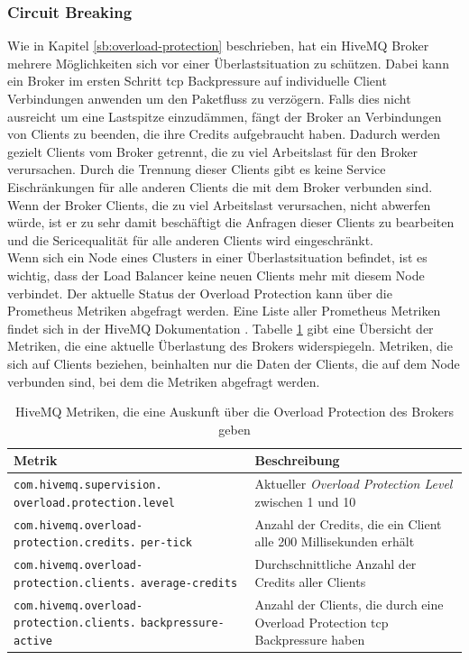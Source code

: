 \subsubsection{Circuit Breaking} \label{ss:circuit-breaking}
Wie in Kapitel \ref{sb:overload-protection} beschrieben, hat ein HiveMQ Broker mehrere Möglichkeiten sich vor einer Überlastsituation zu schützen. Dabei kann ein Broker im ersten Schritt \ac{tcp} Backpressure auf individuelle Client Verbindungen anwenden um den Paketfluss zu verzögern. Falls dies nicht ausreicht um eine Lastspitze einzudämmen, fängt der Broker an Verbindungen von Clients zu beenden, die ihre Credits aufgebraucht haben. Dadurch werden gezielt Clients vom Broker getrennt, die zu viel Arbeitslast für den Broker verursachen. Durch die Trennung dieser Clients gibt es keine Service Eischränkungen für alle anderen Clients die mit dem Broker verbunden sind. Wenn der Broker Clients, die zu viel Arbeitslast verursachen, nicht abwerfen würde, ist er zu sehr damit beschäftigt die Anfragen dieser Clients zu bearbeiten und die Sericequalität für alle anderen Clients wird eingeschränkt.
\\
Wenn sich ein Node eines Clusters in einer Überlastsituation befindet, ist es wichtig, dass der Load Balancer keine neuen Clients mehr mit diesem Node verbindet.
Der aktuelle Status der Overload Protection kann über die Prometheus Metriken abgefragt werden. Eine Liste aller Prometheus Metriken findet sich in der HiveMQ Dokumentation \cite{MonitoringHiveMQDocumentation}. Tabelle \ref{table:overload-protection-metrics} gibt eine Übersicht der Metriken, die eine aktuelle Überlastung des Brokers widerspiegeln. Metriken, die sich auf Clients beziehen, beinhalten nur die Daten der Clients, die auf dem Node verbunden sind, bei dem die Metriken abgefragt werden.\cite{ClusterOverloadProtection}
\begin{table}[htbp]
\centering
\renewcommand{\arraystretch}{1.5}
\begin{tabularx}{\textwidth}{|p{5cm}|X|}
    \hline
    \textbf{Metrik} & \textbf{Beschreibung} \\
    \hline
    \hline
    \verb|com.hivemq.supervision.| \verb|overload.protection.level| & Aktueller \textit{Overload Protection Level} zwischen 1 und 10 \\
    \hline
    \verb|com.hivemq.overload-| \verb|protection.credits.| \verb|per-tick| & Anzahl der Credits, die ein Client alle 200 Millisekunden erhält \\
    \hline
    \verb|com.hivemq.overload-| \verb|protection.clients.| \verb|average-credits| & Durchschnittliche Anzahl der Credits aller Clients \\
    \hline
    \verb|com.hivemq.overload-| \verb|protection.clients.| \verb|backpressure-active| & Anzahl der Clients, die durch eine Overload Protection \ac{tcp} Backpressure haben \\
    \hline
\end{tabularx}
\caption{HiveMQ Metriken, die eine Auskunft über die Overload Protection des Brokers geben}
\label{table:overload-protection-metrics}
\end{table}
